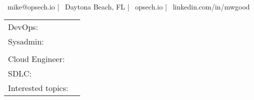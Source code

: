 \documentclass[]{awesome-cv}
\begin{document}
    
\begin{center}
	  \\
	\vspace{2mm}
	{\faEnvelope\ mike@opsech.io} | {\faMapMarker\ Daytona Beach, FL} | {\faLink\ opsech.io} | {\faLinkedin\ linkedin.com/in/mwgood}
\end{center}

\begin{cventries}
	\cventry
	{}
	{\def\arraystretch{1.15}{\begin{tabular}{ l l }
		DevOps:  & {\skill{ Docker, Docker-compose, Ansible, git, YAML, Gitlab-CI, Travis-CI, CI/CD, Packer, Terraform }} \\
		Sysadmin:  & {\skill{ RHEV, RHEL, CentOS, Ubuntu, Debian, systemd, NGINX, keepalived, freeswitch, MariaDB / MySQL, }} \\ 
		& {\skill{ Redis, GlusterFS, nodeJS, PHP-FPM }} \\
		Cloud Engineer:  & {\skill{ AWS, ELB, EC2, CloudFront, CloudWatch, IAM, RDS, ElastiCache, Route 53, S3 }} \\
		SDLC: & {\skill{ Agile: Scrum / Kanban, Waterfall, Pipelines }} \\
		Interested topics: & {\skill{  Enterprise Kubernetes (k8s) experience, Attaining the Certified Kubernetes Administrator (CKA) Certification }} \\
	\end{tabular}}}
	{}
	{}
	{}
\end{cventries}
\end{document}
